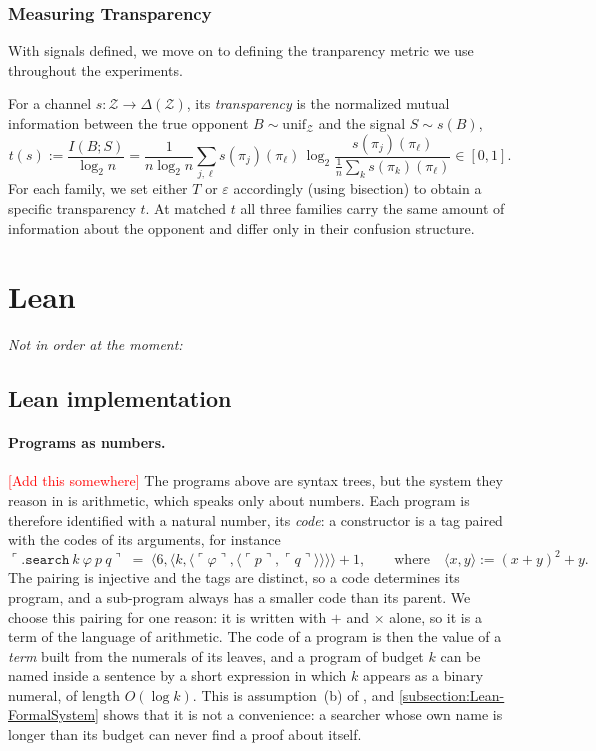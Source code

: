 \documentclass[twoside,11pt]{article}
\begin{document}
\subsubsection{Measuring Transparency}
\label{apx-subsubsection:Theory-PartialTransparency-Dials}
With signals defined, we move on to defining the tranparency metric we use throughout the experiments.

\begin{definition}\label{def:App-Calibration}
For a channel $s : \mathcal{Z} \to \Delta(\mathcal{Z})$, its \emph{transparency} is the normalized
mutual information between the true opponent $B \sim \mathrm{unif}_{\mathcal{Z}}$ and the signal
$S \sim s(B)$,
\[
  t(s) := \frac{I(B;S)}{\log_2 n}
        = \frac{1}{n\log_2 n}\sum_{j,\ell} s(\pi_j)(\pi_\ell)\,
          \log_2\frac{s(\pi_j)(\pi_\ell)}{\frac{1}{n}\sum_{k} s(\pi_k)(\pi_\ell)} \in [0,1].
\]
For each family, we set either $T$ or $\varepsilon$ accordingly (using bisection) to obtain a specific transparency $t$. At matched $t$ all three families carry the same amount of information about the opponent and differ only in their confusion structure.
\end{definition}

\section{Lean}
\textit{Not in order at the moment:}
\subsection{Lean implementation}
\label{apx-subsubsection:Lean-Implementation-Encoding}
\paragraph{Programs as numbers.} \textcolor{red}{[Add this somewhere]} The programs above are syntax trees, but the system they reason in is arithmetic, which speaks only about numbers. Each program is therefore identified with a natural number, its \emph{code}: a constructor is a tag paired with the codes of its arguments, for instance
\[
  \ulcorner \texttt{.search}\ k\ \varphi\ p\ q \urcorner \;=\; \langle 6, \langle k, \langle \ulcorner\varphi\urcorner, \langle \ulcorner p\urcorner, \ulcorner q\urcorner\rangle\rangle\rangle\rangle + 1,
  \qquad\text{where}\quad \langle x, y\rangle := (x+y)^2 + y .
\]
The pairing is injective and the tags are distinct, so a code determines its program, and a sub-program always has a smaller code than its parent. We choose this pairing for one reason: it is written with $+$ and $\times$ alone, so it is a term of the language of arithmetic. The code of a program is then the value of a \emph{term} built from the numerals of its leaves, and a program of budget $k$ can be named inside a sentence by a short expression in which $k$ appears as a binary numeral, of length $O(\log k)$. This is assumption~(b) of \citet{Critch}, and \cref{subsection:Lean-FormalSystem} shows that it is not a convenience: a searcher whose own name is longer than its budget can never find a proof about itself.
\end{document}
